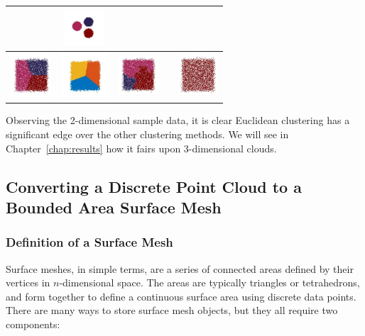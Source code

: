 \documentclass[12pt]{drexelthesis}
\let\Oldsubsection\subsection
\renewcommand{\subsection}{\FloatBarrier\Oldsubsection}
\let\Oldsubsubsection\subsubsection
\renewcommand{\subsubsection}{\FloatBarrier\Oldsubsubsection}
\begin{document}
\begin{table}[h!]
\begin{tabular}{ | c | c | c | c | c | }
      &
            \includegraphics[width=1.5cm]{2d-cluster-tests/euclidean-distance/solid_circles.jpg}
      \\ \hline
      
            \includegraphics[width=1.5cm]{2d-cluster-tests/k-means/plane.jpg}
      & 
            \includegraphics[trim={0 0cm 0 0.25cm},clip,width=1.75cm]{2d-cluster-tests/fcm/plane.jpg}
      & 
            \includegraphics[width=1.5cm]{2d-cluster-tests/agglomerative/plane.jpg}
      &
      
      &
            \includegraphics[width=1.5cm]{2d-cluster-tests/euclidean-distance/plane.jpg}
      \\ \hline
      
      \end{tabular}
      \end{table}

Observing the 2-dimensional sample data, it is clear Euclidean clustering has a significant edge over the other clustering methods. We will see in Chapter~\ref{chap:results} how it fairs upon 3-dimensional clouds.

\subsection{Converting a Discrete Point Cloud to a Bounded Area Surface Mesh}
\label{subsec:meshing}
\subsubsection{Definition of a Surface Mesh}
\label{subsubsec:surfdef}
Surface meshes, in simple terms, are a series of connected areas defined by their vertices in $n$-dimensional space. The areas are typically triangles or tetrahedrons, and form together to define a continuous surface area using discrete data points. There are many ways to store surface mesh objects, but they all require two components:
\end{document}
